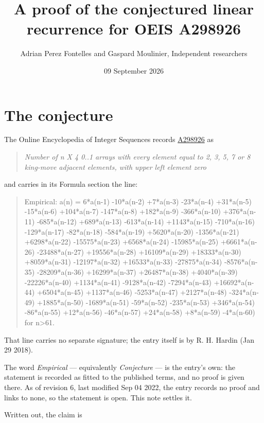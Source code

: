 \documentclass[11pt]{article}
\title{A proof of the conjectured linear recurrence for OEIS A298926}
\author{Adrian Perez Fontelles and Gaspard Moulinier, Independent researchers}
\date{09 September 2026}
\theoremstyle{definition}
\begin{document}
\maketitle
\section{The conjecture}

The Online Encyclopedia of Integer Sequences records \href{https://oeis.org/A298926}{A298926} as

\begin{quote}\itshape Number of n X 4 0..1 arrays with every element equal to 2, 3, 5, 7 or 8 king-move adjacent elements, with upper left element zero\end{quote}

and carries in its Formula section the line:

\begin{quote}\ttfamily Empirical: a(n) = 6*a(n-1) -10*a(n-2) +7*a(n-3) -23*a(n-4) +31*a(n-5) -15*a(n-6) +104*a(n-7) -147*a(n-8) +182*a(n-9) -366*a(n-10) +376*a(n-11) -685*a(n-12) +689*a(n-13) -613*a(n-14) +1143*a(n-15) -710*a(n-16) -129*a(n-17) -82*a(n-18) -584*a(n-19) +5620*a(n-20) -1356*a(n-21) +6298*a(n-22) -15575*a(n-23) +6568*a(n-24) -15985*a(n-25) +6661*a(n-26) -23488*a(n-27) +19556*a(n-28) +16109*a(n-29) +18333*a(n-30) +8059*a(n-31) -12197*a(n-32) +16533*a(n-33) -27875*a(n-34) -8576*a(n-35) -28209*a(n-36) +16299*a(n-37) +26487*a(n-38) +4040*a(n-39) -22226*a(n-40) +1134*a(n-41) -9128*a(n-42) -7294*a(n-43) +16692*a(n-44) +6504*a(n-45) +1137*a(n-46) -5253*a(n-47) +2127*a(n-48) -324*a(n-49) +1885*a(n-50) -1689*a(n-51) -59*a(n-52) -235*a(n-53) +346*a(n-54) -86*a(n-55) +12*a(n-56) -46*a(n-57) +24*a(n-58) +8*a(n-59) -4*a(n-60) for n>61.\end{quote}

That line carries no separate signature; the entry itself is by R. H. Hardin (Jan 29 2018).

The word {\itshape Empirical} --- equivalently {\itshape Conjecture} --- is the entry's own: the statement is recorded as fitted to the published terms, and no proof is given there. As of revision 6, last modified Sep 04 2022, the entry records no proof and links to none, so the statement is open. This note settles it.

Written out, the claim is
\end{document}
